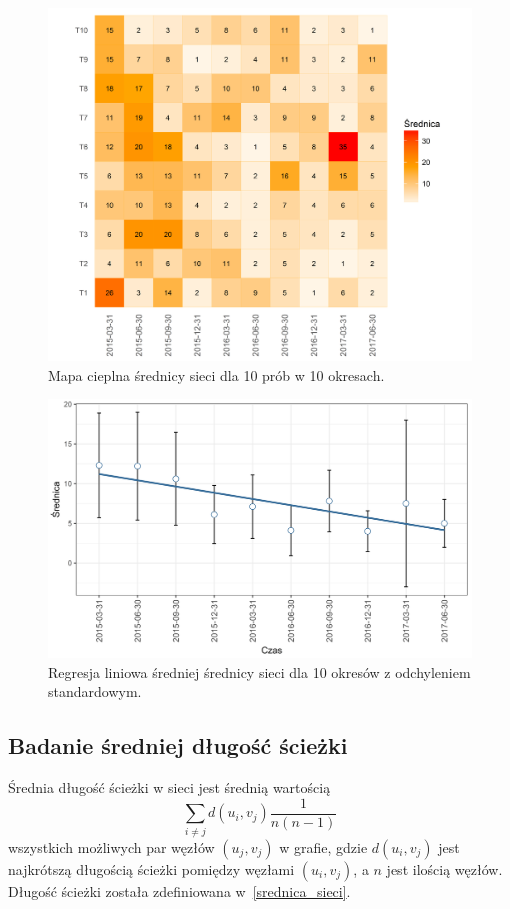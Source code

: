 \documentclass[12pt, twoside, final, openany]{mgr}
\newcommand{\chartsWidth}{0.80}
\begin{document}
\newpage
\begin{figure}[H]
\centering
  \includegraphics[width=\chartsWidth\linewidth]{pictures/srednica/srednica_hm.png}
  \caption{Mapa cieplna średnicy sieci dla 10 prób w 10 okresach.}
  \label{fig:s1} 
\end{figure}
\begin{figure}[H]
\centering
  \includegraphics[width=\chartsWidth\linewidth]{pictures/srednica/srednica_sda.png}
  \caption{Regresja liniowa średniej średnicy sieci dla 10 okresów z odchyleniem standardowym.}
  \label{fig:s2}
\end{figure}


\newpage
\subsection{Badanie średniej długość ścieżki}
\label{dlugosc_sciezki}
\indent Średnia długość ścieżki w sieci jest średnią wartością 
\begin{equation}
\label{eq:dlugosc_sciezki}
	\sum_{i \ne j}^{} d(u_i,v_j)\frac{1}{n(n-1)}
\end{equation}
wszystkich możliwych par węzłów $(u_j,v_j)$ w grafie, gdzie $d(u_i,v_j)$ jest najkrótszą długością ścieżki pomiędzy węzłami $(u_i,v_j)$, a $n$ jest ilością węzłów\cite{wasserman1994social}. Długość ścieżki została zdefiniowana w~\ref{srednica_sieci}. 
\end{document}
